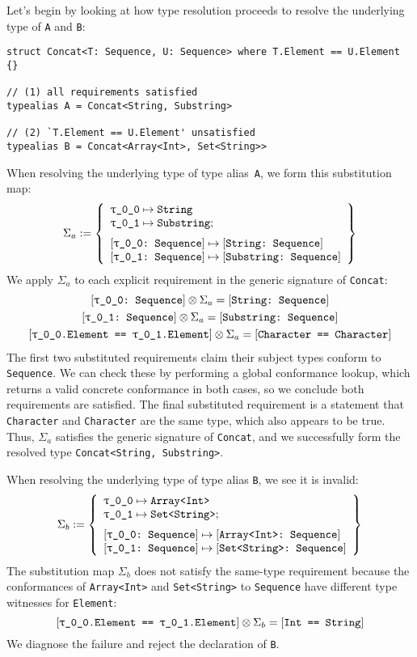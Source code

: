 \documentclass[../generics]{subfiles}
\begin{document}
\begin{example}
Let's begin by looking at how type resolution proceeds to resolve the underlying type of \texttt{A} and \texttt{B}:
\begin{Verbatim}
struct Concat<T: Sequence, U: Sequence> where T.Element == U.Element {}

// (1) all requirements satisfied
typealias A = Concat<String, Substring>

// (2) `T.Element == U.Element' unsatisfied
typealias B = Concat<Array<Int>, Set<String>>
\end{Verbatim}
When resolving the underlying type of type alias~\texttt{A}, we form this substitution map:
\[
\Sigma_a := \SubstMapLongC{
\SubstType{\ttgp{0}{0}}{String}\\
\SubstType{\ttgp{0}{1}}{Substring}
}{
\SubstConf{\ttgp{0}{0}}{String}{Sequence}\\
\SubstConf{\ttgp{0}{1}}{Substring}{Sequence}
}
\]
We apply $\Sigma_a$ to each explicit requirement in the generic signature of \texttt{Concat}:
\begin{gather*}
\ConfReq{\ttgp{0}{0}}{Sequence}\otimes\Sigma_a = \ConfReq{String}{Sequence}\\
\ConfReq{\ttgp{0}{1}}{Sequence}\otimes\Sigma_a = \ConfReq{Substring}{Sequence}\\
\SameReq{\ttgp{0}{0}.Element}{\ttgp{0}{1}.Element}\otimes\Sigma_a = \SameReq{Character}{Character}
\end{gather*}
The first two substituted requirements claim their subject types conform to \texttt{Sequence}. We can check these by performing a global conformance lookup, which returns a valid concrete conformance in both cases, so we conclude both requirements are satisfied. The final substituted requirement is a statement that \texttt{Character} and \texttt{Character} are the same type, which also appears to be true. Thus, $\Sigma_a$ satisfies the generic signature of \texttt{Concat}, and we successfully form the resolved type \texttt{Concat<String, Substring>}.

When resolving the underlying type of type alias \texttt{B}, we see it is invalid:
\[
\Sigma_b := \SubstMapLongC{
\SubstType{\ttgp{0}{0}}{Array<Int>}\\
\SubstType{\ttgp{0}{1}}{Set<String>}
}{
\SubstConf{\ttgp{0}{0}}{Array<Int>}{Sequence}\\
\SubstConf{\ttgp{0}{1}}{Set<String>}{Sequence}
}
\]
The substitution map $\Sigma_b$ does not satisfy the same-type requirement because the conformances of \texttt{Array<Int>} and \texttt{Set<String>} to \texttt{Sequence} have different type witnesses for \texttt{Element}:
\[[\texttt{\texttt{$\uptau$\_0\_0}.Element == \texttt{$\uptau$\_0\_1}.Element}]\otimes\Sigma_b = [\texttt{Int == String}]\]
We diagnose the failure and reject the declaration of \texttt{B}.
\end{example}
\end{document}
